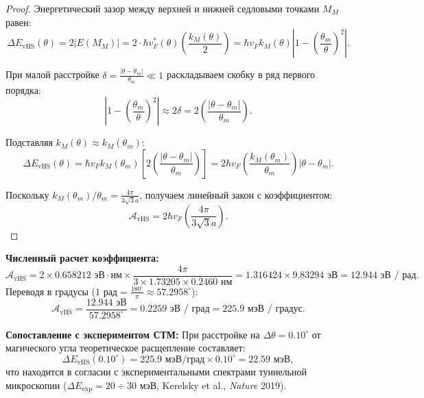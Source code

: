 \documentclass[12pt,a4paper]{article}
\begin{document}
\begin{proof}
	Энергетический зазор между верхней и нижней седловыми точками $M_M$ равен:
	\begin{equation}
		\Delta E_{\text{vHS}}(\theta) = 2 |E(M_M)| = 2 \cdot \hbar v_F^*(\theta) \left( \frac{k_M(\theta)}{2} \right) = \hbar v_F k_M(\theta) \left| 1 - \left(\frac{\theta_m}{\theta}\right)^2 \right|.
	\end{equation}
	
	При малой расстройке $\delta = \frac{|\theta - \theta_m|}{\theta_m} \ll 1$ раскладываем скобку в ряд первого порядка:
	\begin{equation}
		\left| 1 - \left(\frac{\theta_m}{\theta}\right)^2 \right| \approx 2 \delta = 2 \left( \frac{|\theta - \theta_m|}{\theta_m} \right).
	\end{equation}
	
	Подставляя $k_M(\theta) \approx k_M(\theta_m)$:
	\begin{equation}
		\Delta E_{\text{vHS}}(\theta) = \hbar v_F k_M(\theta_m) \left[ 2 \left( \frac{|\theta - \theta_m|}{\theta_m} \right) \right] = 2 \hbar v_F \left( \frac{k_M(\theta_m)}{\theta_m} \right) |\theta - \theta_m|.
	\end{equation}
	
	Поскольку $k_M(\theta_m) / \theta_m = \frac{4\pi}{3\sqrt{3} a}$, получаем линейный закон с коэффициентом:
	\begin{equation}
		\mathcal{A}_{\text{vHS}} = 2 \hbar v_F \left( \frac{4\pi}{3\sqrt{3} a} \right).
	\end{equation}
\end{proof}

\textbf{Численный расчет коэффициента:}
\begin{equation}
	\mathcal{A}_{\text{vHS}} = 2 \times 0.658212\text{ эВ}\cdot\text{нм} \times \frac{4\pi}{3 \times 1.73205 \times 0.2460\text{ нм}} = 1.316424 \times 9.83294\text{ эВ} = \mathbf{12.944\text{ эВ / рад}}.
\end{equation}
Переводя в градусы ($1\text{ рад} = \frac{180^\circ}{\pi} \approx 57.2958^\circ$):
\begin{equation}
	\mathcal{A}_{\text{vHS}} = \frac{12.944\text{ эВ}}{57.2958^\circ} = \mathbf{0.2259\text{ эВ / град}} = \mathbf{225.9\text{ мэВ / градус}}.
\end{equation}

\textbf{Сопоставление с экспериментом СТМ:}
При расстройке на $\Delta \theta = 0.10^\circ$ от магического угла теоретическое расщепление составляет:
\begin{equation}
	\Delta E_{\text{vHS}}(0.10^\circ) = 225.9\text{ мэВ/град} \times 0.10^\circ = \mathbf{22.59\text{ мэВ}},
\end{equation}
что находится в согласии с экспериментальными спектрами туннельной микроскопии ($\Delta E_{\text{exp}} = 20 \div 30\text{ мэВ}$, Kerelsky et al., \textit{Nature} 2019).
\end{document}
